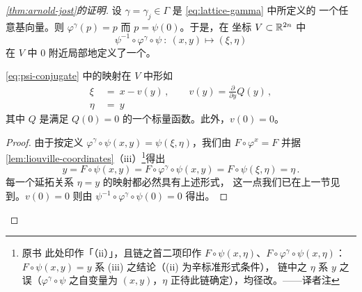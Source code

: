\begin{proof}[\cref*{thm:arnold-jost}的证明]
设 $\gamma=\gamma_{j}\in\Gamma$ 是 \eqref{eq:lattice-gamma} 中所定义\trLattice{}的%
一个任意基向量。则 $\varphi^{\gamma}(p)=p$ 而 $p=\psi(0)$。于是，在%
\trLiouville{}坐标 $V\subset\mathbb{R}^{2n}$ 中
\begin{equation}\label{eq:psi-conjugate}
\psi^{-1}\circ\varphi^{\gamma}\circ\psi\ :\ (x,y)\mapsto(\xi,\eta)
\end{equation}
在 $V$ 中\trFixedPoint{} $0$ 附近局部地定义了一个\trSymplecticDiffeomorphism。

\begin{lemma}\label{lem:gamma-translation}
\eqref{eq:psi-conjugate} 中的\trSymplectic{}映射在 $V$ 中形如
\begin{equation}\label{eq:gamma-map-form}
\begin{aligned}
\xi\ &=\ x-v(y)\,,\qquad v(y)=\frac{\partial}{\partial y}Q(y)\,,\\
\eta\ &=\ y
\end{aligned}
\end{equation}
其中 $Q$ 是满足 $Q(0)=0$ 的一个\trSmooth{}标量函数。此外，$v(0)=0$。
\end{lemma}

\begin{proof}
由于按定义 $\varphi^{\gamma}\circ\psi(x,y)=\psi(\xi,\eta)$，我们由%
$F\circ\varphi^{x}=F$ 并据\cref{lem:liouville-coordinates}（iii）\footnote{原书%
此处印作「（ii）」，且链之首二项印作 $F\circ\psi(x,\eta)$、$F\circ\varphi^{\gamma}\circ%
\psi(x,\eta)$：$F\circ\psi(x,y)=y$ 系 (iii) 之结论（(ii) 为辛标准形式条件），%
链中之 $\eta$ 系 $y$ 之误（$\varphi^{\gamma}\circ\psi$ 之自变量为 $(x,y)$，$\eta$%
正待此链确定），均径改。——译者注}得出
\[
y=F\circ\psi(x,y)=F\circ\varphi^{\gamma}\circ\psi(x,y)=%
F\circ\psi(\xi,\eta)=\eta\,.
\]
每一个延拓关系 $\eta=y$ 的\trSymplectic{}映射都必然具有上述形式，%
这一点我们已在上一节见到。$v(0)=0$ 则由 $\psi^{-1}\circ\varphi^{\gamma}\circ%
\psi(0)=0$ 得出。
\end{proof}


\end{proof}
